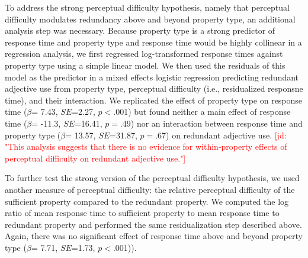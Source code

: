 \documentclass[12pt,letterpaper]{article}
\newcommand{\jd}[1]{\textcolor{Red}{[jd: #1]}}
\begin{document}
To address the strong perceptual difficulty hypothesis, namely that perceptual difficulty modulates redundancy above and beyond property type, an additional analysis step was necessary. Because property type is a strong predictor of response time and property type and response time would be highly collinear in a regression analysis, we first regressed log-transformed response times against property type using a simple linear model. %
We then used the residuals of this model as the predictor in a mixed effects logistic regression predicting redundant adjective use from property type, perceptual difficulty (i.e., residualized responsne time), and their interaction. We replicated the effect of property type on response time ($\beta$= 7.43, $SE$=2.27, $p$$<$.001) but found neither a main effect of response time ($\beta$= -11.3, $SE$=16.41, $p$$=$.49) nor an interaction between response time and property type ($\beta$= 13.57, $SE$=31.87, $p$$=$.67) on redundant adjective use. \jd{"This analysis suggests that there is no evidence for within-property effects of perceptual difficulty on redundant adjective use."}

To further test the strong version of the perceptual difficulty hypothesis, we used another measure of perceptual difficulty: the relative perceptual difficulty of the sufficient property compared to the redundant property. We computed the log ratio of mean response time to sufficient property to mean response time to redundant property and performed the same residualization step described above. Again, there was no significant effect of response time above and beyond property type ($\beta$= 7.71, $SE$=1.73, $p$$<$.001)).
\end{document}

